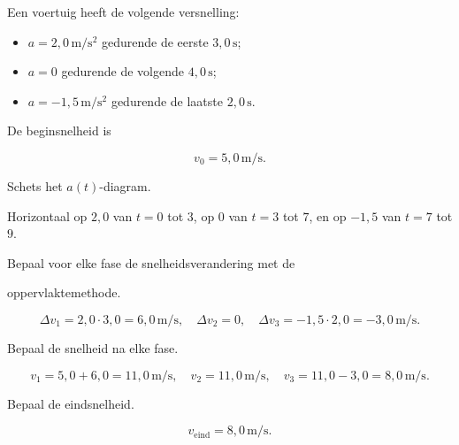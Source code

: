 \documentclass{ximera}
\begin{document}
\begin{oefening}{\oefU\ESS}

Een voertuig heeft de volgende versnelling:

\begin{itemize}

 \item $a=2,0\,\mathrm{m/s^2}$ gedurende de eerste $3,0\,\mathrm{s}$;

 \item $a=0$ gedurende de volgende $4,0\,\mathrm{s}$;

 \item $a=-1,5\,\mathrm{m/s^2}$ gedurende de laatste $2,0\,\mathrm{s}$.

\end{itemize}

De beginsnelheid is

\[v_0=5,0\,\mathrm{m/s}.\]

\begin{question}

Schets het $a(t)$-diagram.

\begin{oplossing}
Horizontaal op \(2,0\) van \(t=0\) tot \(3\), op \(0\) van \(t=3\) tot \(7\), en op \(-1,5\) van \(t=7\) tot \(9\).
\end{oplossing}

\end{question}

\begin{question}

Bepaal voor elke fase de snelheidsverandering met de

oppervlaktemethode.

\begin{oplossing}
\[\Delta v_1=2,0\cdot3,0=6,0\,\mathrm{m/s}, \quad \Delta v_2=0, \quad \Delta v_3=-1,5\cdot2,0=-3,0\,\mathrm{m/s}.\]
\end{oplossing}

\end{question}

\begin{question}

Bepaal de snelheid na elke fase.

\begin{oplossing}
\[v_1=5,0+6,0=11,0\,\mathrm{m/s}, \quad v_2=11,0\,\mathrm{m/s}, \quad v_3=11,0-3,0=8,0\,\mathrm{m/s}.\]
\end{oplossing}

\end{question}

\begin{question}

Bepaal de eindsnelheid.

\begin{oplossing}
\[\boxed{v_{\mathrm{eind}}=8,0\,\mathrm{m/s}}.\]
\end{oplossing}

\end{question}

\end{oefening}
\end{document}
